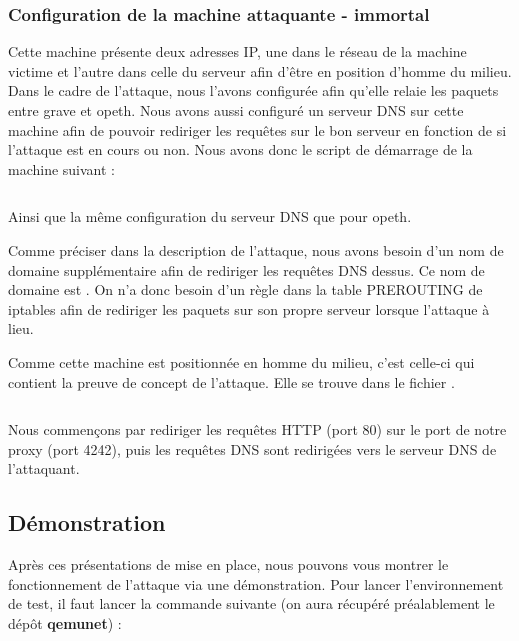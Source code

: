 \inputminted[bgcolor=lbcolor, breaklines]{shell}{../sslstrip2/opeth/start.sh}

\subsubsection{Configuration de la machine attaquante - immortal}

Cette machine présente deux adresses IP, une dans le réseau de la machine victime et l'autre dans celle du serveur afin d'être en position d'homme du milieu. Dans le cadre de l'attaque, nous l'avons configurée afin qu'elle relaie les paquets entre grave et opeth. Nous avons aussi configuré un serveur DNS sur cette machine afin de pouvoir rediriger les requêtes sur le bon serveur en fonction de si l'attaque est en cours ou non. Nous avons donc le script de démarrage de la machine suivant :

\inputminted[bgcolor=lbcolor, breaklines]{shell}{../sslstrip2/immortal/start.sh}

Ainsi que la même configuration du serveur DNS que pour opeth.

Comme préciser dans la description de l'attaque, nous avons besoin d'un nom de domaine supplémentaire afin de rediriger les requêtes DNS dessus. Ce nom de domaine est . On n'a donc besoin d'un règle dans la table PREROUTING de iptables afin de rediriger les paquets sur son propre serveur lorsque l'attaque à lieu.

Comme cette machine est positionnée en homme du milieu, c'est celle-ci qui contient la preuve de concept de l'attaque. Elle se trouve dans le fichier .

\inputminted[bgcolor=lbcolor, breaklines]{shell}{../sslstrip2/immortal/attack.sh}

Nous commençons par rediriger les requêtes HTTP (port 80) sur le port de notre proxy (port 4242), puis les requêtes DNS sont redirigées vers le serveur DNS de l'attaquant.

\subsection{Démonstration}

Après ces présentations de mise en place, nous pouvons vous montrer le fonctionnement de l'attaque via une démonstration. Pour lancer l'environnement de test, il faut lancer la commande suivante (on aura récupéré préalablement le dépôt \textbf{qemunet}) :

